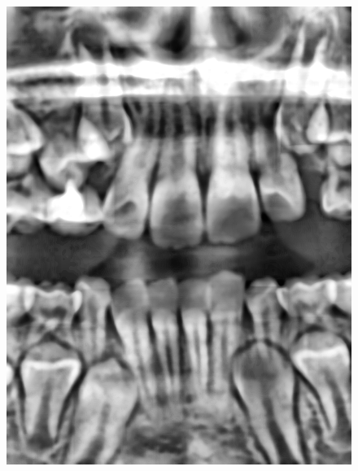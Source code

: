 \documentclass[a4paper,titlepage,12pt]{article}
\begin{document}
\begin{figure}
\begin{minipage}[b]{0.32\linewidth}
		\includegraphics[width=\linewidth]{preprocess/clahe.png}
	\end{minipage}
	\begin{minipage}[b]{0.32\linewidth}

\end{minipage}
\end{figure}
\end{document}
